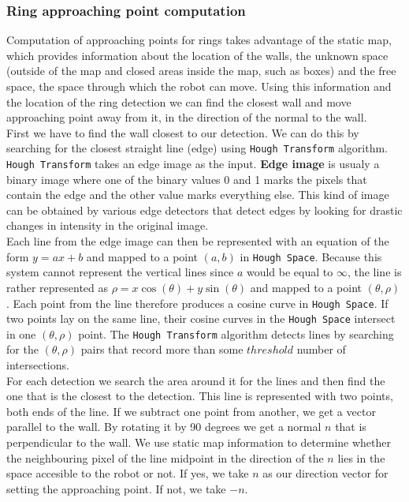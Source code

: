 \documentclass[12pt,a4paper]{article}
\begin{document}
	\subsubsection{Ring approaching point computation}
	Computation of approaching points for rings takes advantage of the static map, which provides information about the location of the walls, the unknown space (outside of the map and closed areas inside the map, such as boxes) and the free space, the space through which the robot can move. Using this information and the location of the ring detection we can find the closest wall and move approaching point away from it, in the direction of the normal to the wall. \\

	First we have to find the wall closest to our detection. We can do this by searching for the closest straight line (edge) using \texttt{Hough Transform} algorithm. \texttt{Hough Transform} takes an edge image as the input. \textbf{Edge image} is usualy a binary image where one of the binary values 0 and 1 marks the pixels that contain the edge and the other value marks everything else. This kind of image can be obtained by various edge detectors that detect edges by looking for drastic changes in intensity in the original image. \\
	
	Each line from the edge image can then be represented with an equation of the form $y = ax + b$ and mapped to a point $(a, b)$ in \texttt{Hough Space}. Because this system cannot represent the vertical lines since $a$ would be equal to $\infty$, the line is rather represented as $\rho = x\cos(\theta) + y\sin(\theta)$ and mapped to a point $(\theta, \rho)$. Each point from the line therefore produces a cosine curve in \texttt{Hough Space}. If two points lay on the same line, their cosine curves in the \texttt{Hough Space} intersect in one $(\theta, \rho)$ point. The \texttt{Hough Transform} algorithm detects lines by searching for the $(\theta, \rho)$ pairs that record more than some $threshold$ number of intersections. \\

	For each detection we search the area around it for the lines and then find the one that is the closest to the detection. This line is represented with two points, both ends of the line. If we subtract one point from another, we get a vector parallel to the wall. By rotating it by 90 degrees we get a normal $n$ that is perpendicular to the wall. We use static map information to determine whether the neighbouring pixel of the line midpoint in the direction of the $n$ lies in the space accesible to the robot or not. If yes, we take $n$ as our direction vector for setting the approaching point. If not, we take $-n$. \\
\end{document}
